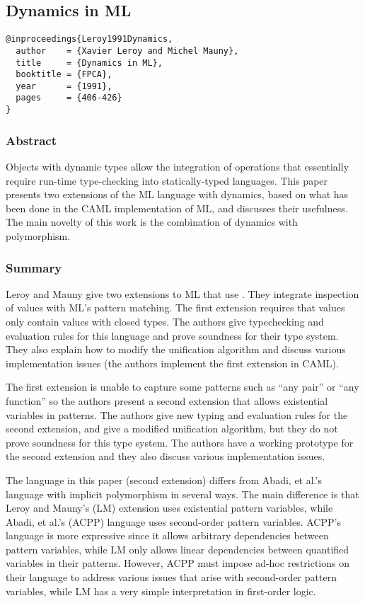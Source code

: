 \documentclass[12pt]{article}	%
\begin{document}
\subsection*{Dynamics in ML~\cite{Leroy1991Dynamics}}
\begin{verbatim}
@inproceedings{Leroy1991Dynamics,
  author    = {Xavier Leroy and Michel Mauny},
  title     = {Dynamics in ML},
  booktitle = {FPCA},
  year      = {1991},
  pages     = {406-426}
}
\end{verbatim}

\newcommand{\mlcode}[1]{$\mathtt{#1}$}

\subsubsection*{Abstract}
Objects with dynamic types allow the integration of operations that essentially require run-time type-checking into statically-typed languages. This paper presents two extensions of the ML language with dynamics, based on what has been done in the CAML implementation of ML, and discusses their usefulness. The main novelty of this work is the combination of dynamics with polymorphism.

\subsubsection*{Summary}
Leroy and Mauny give two extensions to ML that use \Dynamic. They integrate inspection of \Dynamic values with ML's pattern matching. The first extension requires that \Dynamic values only contain values with closed types. The authors give typechecking and evaluation rules for this language and prove soundness for their type system. They also explain how to modify the unification algorithm and discuss various implementation issues (the authors implement the first extension in CAML).

The first extension is unable to capture some patterns such as ``any pair'' or ``any function'' so the authors present a second extension that allows existential variables in patterns. The authors give new typing and evaluation rules for the second extension, and give a modified unification algorithm, but they do not prove soundness for this type system. The authors have a working prototype for the second extension and they also discuss various implementation issues.

The language in this paper (second extension) differs from Abadi, et al.'s language with implicit polymorphism in several ways. The main difference is that Leroy and Mauny's (LM) extension uses existential pattern variables, while Abadi, et al.'s (ACPP) language uses second-order pattern variables. ACPP's language is more expressive since it allows arbitrary dependencies between pattern variables, while LM only allows linear dependencies between quantified variables in their patterns. However, ACPP must impose ad-hoc restrictions on their language to address various issues that arise with second-order pattern variables, while LM has a very simple interpretation in first-order logic.
\end{document}
